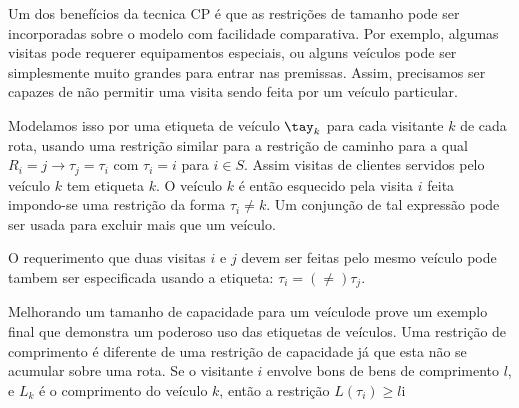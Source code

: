 \documentclass[a4paper, 12pt]{article}
\begin{document}
 Um dos benefícios da tecnica CP é que as restrições de tamanho pode ser incorporadas sobre o modelo
com facilidade comparativa. Por exemplo, algumas visitas pode requerer equipamentos especiais, ou
alguns veículos pode ser simplesmente muito grandes para entrar nas premissas. Assim, precisamos ser
capazes de não permitir uma visita sendo feita por um veículo particular.

 Modelamos isso por uma etiqueta de veículo $\tay_k$ para cada visitante $k$ de cada rota, usando
uma restrição similar para a restrição de caminho para a qual $R_i = j\rightarrow \tau_j=\tau_i$ com
$\tau_i = i$ para $i\in S$. Assim visitas de clientes servidos pelo veículo $k$ tem etiqueta $k$. O
veículo $k$ é então esquecido pela visita $i$ feita impondo-se uma restrição da forma $\tau_i \neq
k$. Um conjunção de tal expressão pode ser usada para excluir mais que um veículo.

 O requerimento que duas visitas $i$ e $j$ devem ser feitas pelo mesmo veículo pode tambem ser
especificada usando a etiqueta: $\tau_i = (\neq ) \tau_j.$

 Melhorando um tamanho de capacidade para um veículode prove um exemplo final que demonstra um
poderoso uso das etiquetas de veículos. Uma restrição de comprimento é diferente de uma restrição de
capacidade já que esta não se acumular sobre uma rota. Se o visitante $i$ envolve bons de bens de
comprimento $l$, e $L_k$ é o comprimento do veículo $k$, então a restrição $L(\tau_i) \geq l$i
\end{document}
